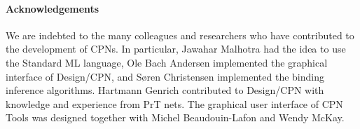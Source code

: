 \documentclass[nocopyrightspace]{sig-alternate}
\begin{document}


\vspace*{-.75em}
\paragraph*{Acknowledgements}  We are indebted to the many collea\-gues and researchers who have contributed to the development of CPNs. In particular, Jawahar Malhotra had the idea to use the Standard ML language, Ole Bach Andersen implemented the graphical interface of Design/CPN,
and S\o{}ren Christensen implemented the binding inference
algorithms. Hartmann Genrich contributed to Design/CPN with knowledge
and experience from PrT nets. The graphical user interface of CPN
Tools was designed together with Michel Beaudouin-Lafon and Wendy
McKay.

\vspace*{-0.75em}

\end{document}
